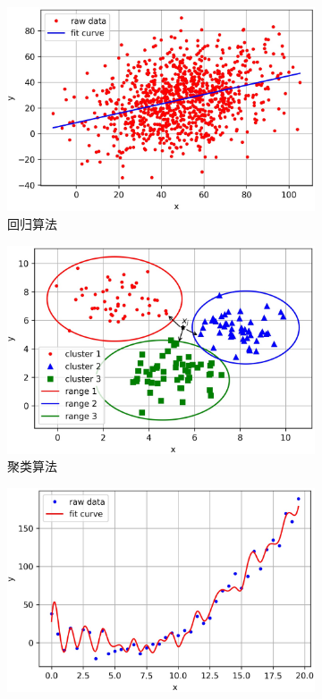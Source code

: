  \begin{figure}[htp]
	 \centering

	 \begin{subfigure}{.33\textwidth}
		 \centering
		 \includegraphics[width=\linewidth]{imgs/2.1.1.eps}
		 \caption{回归算法}
		 \label{fig:2.sub.1}
	 \end{subfigure}\hfil%
	 \begin{subfigure}{.33\textwidth}
		 \centering
		 \includegraphics[width=\linewidth]{imgs/2.1.2.eps}
		 \caption{聚类算法}
		 \label{fig:2.sub.2}
	 \end{subfigure}\hfil%
	 \begin{subfigure}{.33\textwidth}
		 \centering
		 \includegraphics[width=\linewidth]{imgs/2.1.3.eps}

\end{subfigure}
\end{figure}
